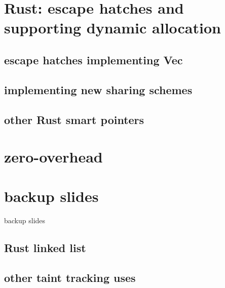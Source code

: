 \section{Rust: escape hatches and supporting dynamic allocation}


\subsection{escape hatches implementing Vec}


\subsection{implementing new sharing schemes}


\subsection{other Rust smart pointers}


\section{zero-overhead}


\section{backup slides}
\begin{frame}{backup slides}
\end{frame}

\subsection{Rust linked list}



\subsection{other taint tracking uses}



